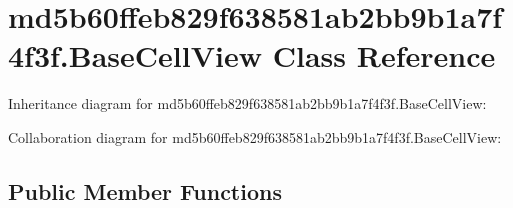 \hypertarget{classmd5b60ffeb829f638581ab2bb9b1a7f4f3f_1_1_base_cell_view}{}\section{md5b60ffeb829f638581ab2bb9b1a7f4f3f.\+Base\+Cell\+View Class Reference}
\label{classmd5b60ffeb829f638581ab2bb9b1a7f4f3f_1_1_base_cell_view}


Inheritance diagram for md5b60ffeb829f638581ab2bb9b1a7f4f3f.\+Base\+Cell\+View\+:


Collaboration diagram for md5b60ffeb829f638581ab2bb9b1a7f4f3f.\+Base\+Cell\+View\+:
\subsection*{Public Member Functions}
